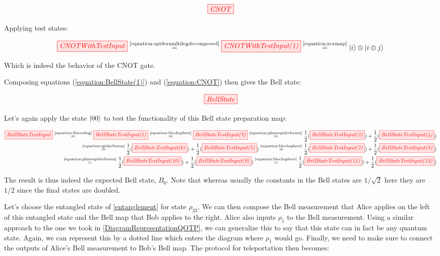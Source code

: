 \documentclass[]{article}
\newcommand{\equaltext}[1]{\ensuremath{\stackrel{\text{#1}}{=}}}
\begin{document}
\begin{equation}
	\label{equation:CNOT}
	\tikzfig{CNOT}
\end{equation}

Applying test states:

\begin{equation}
	\tikzfig{CNOTWithTestInput} \equaltext{\ref{equation:spidermultilegdecomposed}} \tikzfig{CNOTWithTestInput(1)} \equaltext{\ref{equation:xormap}} \ket{i} \otimes \ket{i \oplus j}
\end{equation}

Which is indeed the behavior of the CNOT gate.

Composing equations (\ref{equation:BellState(1)}) and (\ref{equation:CNOT}) then gives the Bell state:

\begin{equation}
	\tikzfig{BellState}
\end{equation}

Let's again apply the state $\ket{00}$ to test the functionality of this Bell state preparation map:

\begin{equation}
\label{BellStateTestInput}
	\begin{split}
	\tikzfig{BellStateTestInput} \equaltext{\ref{equation:Encoding}} \tikzfig{BellStateTestInput(1)} \equaltext{\ref{equation:blochsphere}} \tikzfig{BellStateTestInput(2)} \equaltext{\ref{equation:phasespiderfusion}}
	 \frac{1}{2}(\tikzfig{BellStateTestInput(3)})+
	\frac{1}{2}(\tikzfig{BellStateTestInput(4)}) 
 \\ \equaltext{\ref{equation:spiderfusion}}
 	\frac{1}{2}(\tikzfig{BellStateTestInput(6)}) +
  \frac{1}{2}(\tikzfig{BellStateTestInput(5)}) 
	\equaltext{\ref{equation:blochsphere}} \frac{1}{2}(\tikzfig{BellStateTestInput(7)}) + \frac{1}{2}(\tikzfig{BellStateTestInput(8)}) \\ \equaltext{\ref{equation:phasespiderfusion}}
	\frac{1}{2}(\tikzfig{BellStateTestInput(10)}) +
	 \frac{1}{2}(\tikzfig{BellStateTestInput(9)}) 
	 \equaltext{\ref{equation:blochsphere}} \frac{1}{2}(\tikzfig{BellStateTestInput(11)}) +
	\frac{1}{2}(\tikzfig{BellStateTestInput(12)})
	\end{split}
\end{equation}

The result is thus indeed the expected Bell state, $B_0$. Note that whereas usually the constants in the Bell states are $1/\sqrt{2}$ here they are $1/2$ since the final states are doubled.

Let's choose the entangled state of \ref{entanglement} for state $\rho_{23}$. We can then compose the Bell measurement that Alice applies on the left of this entangled state and the Bell map that Bob applies to the right. Alice also inputs $\rho_1$ to the Bell measurement. Using a similar approach to the one we took in \ref{DiagramRepresentationQOTP}, we can generalize this to say that this state can in fact be any quantum state. Again, we can represent this by a dotted line which enters the diagram where $\rho_1$ would go. Finally, we need to make sure to connect the outputs of Alice's Bell measurement to Bob's Bell map. The protocol for teleportation then becomes: 
 
\end{document}
